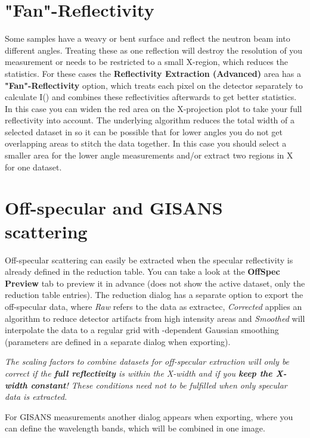   \section{"Fan"-Reflectivity}
  \label{sec:fan}
    Some samples have a weavy or bent surface and reflect the neutron beam into different angles. 
    Treating these as one reflection will destroy the \Qz resolution of you measurement or needs to be restricted to a small X-region, which reduces the statistics.
    For these cases the \textbf{Reflectivity Extraction (Advanced)} area has a \textbf{"Fan"-Reflectivity} option, which treats each pixel on the detector separately to calculate I(\Qz) and combines these reflectivities afterwards to get better statistics. 
    In this case you can widen the red area on the X-projection plot to take your full reflectivity into account.
    The underlying algorithm reduces the total width of a selected dataset in \Qz so it can be possible that for lower angles you do not get overlapping areas to stitch the data together.
    In this case you should select a smaller area for the lower angle measurements and/or extract two regions in X for one dataset.
  
  \section{Off-specular and GISANS scattering}
    Off-specular scattering can easily be extracted when the specular reflectivity is already defined in the reduction table. 
    You can take a look at the \textbf{OffSpec Preview} tab to preview it in advance (does not show the active dataset, only the reduction table entries).
    The reduction dialog has a separate option to export the off-specular data, where \textit{Raw} refers to the data as extractec, \textit{Corrected} applies an algorithm to reduce detector artifacts from high intensity areas and \textit{Smoothed} will interpolate the data to a regular grid with \Qz-dependent Gaussian smoothing (parameters are defined in a separate dialog when exporting).
    
    \textit{The scaling factors to combine datasets for off-specular extraction will only be correct if the \textbf{full reflectivity} is within the X-width and if you \textbf{keep the X-width constant}! These conditions need not to be fulfilled when only specular data is extracted.}
    
    For GISANS measurements another dialog appears when exporting, where you can define the wavelength bands, which will be combined in one image.
  
  